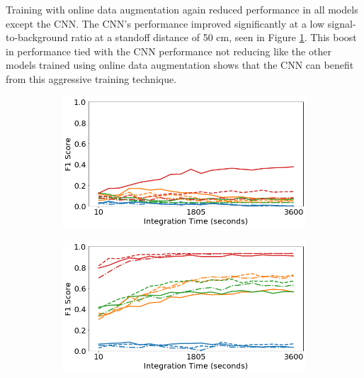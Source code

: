 Training with online data augmentation again reduced performance in all models except the CNN. The CNN's performance improved significantly at a low signal-to-background ratio at a standoff distance of 50 cm, seen in Figure \ref{fig:generalization-dist-aug-easy-01}. This boost in performance tied with the CNN performance not reducing like the other models trained using online data augmentation shows that the CNN can benefit from this aggressive training technique.


\begin{figure}[H]
     \centering
     \begin{subfigure}[b]{0.49\textwidth}
         \centering
         \includegraphics[width=\textwidth]{images/generalization-dist-aug-easy-01.png}
         \caption{}
         \label{fig:generalization-dist-aug-easy-01}
     \end{subfigure}
     \hfill
     \begin{subfigure}[b]{0.49\textwidth}
         \centering
         \includegraphics[width=\textwidth]{images/generalization-dist-aug-easy-05.png}
         \caption{}
         \label{fig:generalization-dist-aug-easy-05}
     \end{subfigure}


\end{figure}
